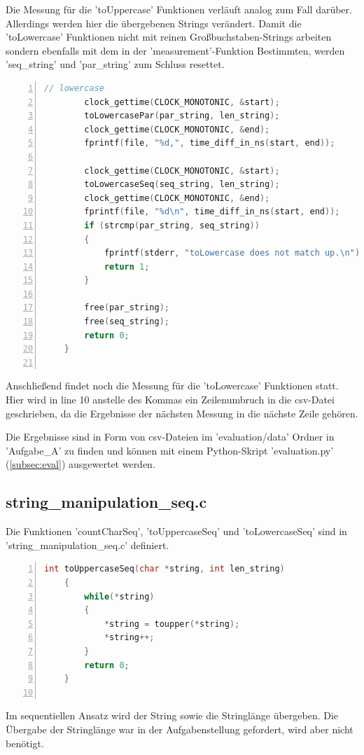 \documentclass[plainarticle,zihtitle,german,final,hyperref,utf8]{zihpub}
\begin{document}
Die Messung für die 'toUppercase' Funktionen verläuft analog zum Fall darüber. Allerdings werden hier die übergebenen Strings verändert. Damit die 'toLowercase' Funktionen nicht mit reinen Großbuchstaben-Strings arbeiten sondern ebenfalls mit dem in der 'measurement'-Funktion Bestimmten, werden 'seq\_string' und 'par\_string' zum Schluss  resettet.

\begin{lstlisting}[language=c, numbers=left]		
		// lowercase
		clock_gettime(CLOCK_MONOTONIC, &start);	
		toLowercasePar(par_string, len_string);
		clock_gettime(CLOCK_MONOTONIC, &end);
		fprintf(file, "%d,", time_diff_in_ns(start, end));	
		
		clock_gettime(CLOCK_MONOTONIC, &start);	
		toLowercaseSeq(seq_string, len_string);
		clock_gettime(CLOCK_MONOTONIC, &end);
		fprintf(file, "%d\n", time_diff_in_ns(start, end));	
		if (strcmp(par_string, seq_string))
		{
			fprintf(stderr, "toLowercase does not match up.\n");
			return 1;
		}
		
		free(par_string);
		free(seq_string);
		return 0;
	}
	
\end{lstlisting}

Anschließend findet noch die Messung für die 'toLowercase' Funktionen statt.
Hier wird in line 10 anstelle des Kommas ein Zeilenumbruch in die csv-Datei geschrieben, da die Ergebnisse der nächsten Messung in die nächste Zeile gehören.

Die Ergebnisse sind in Form von csv-Dateien im 'evaluation/data' Ordner in 'Aufgabe\_A' zu finden und können mit einem Python-Skript 'evaluation.py' (\ref{subsec:eval}) ausgewertet werden.


\subsection{string\_manipulation\_seq.c}
Die Funktionen 'countCharSeq', 'toUppercaseSeq' und 'toLowercaseSeq' sind in 'string\_manipulation\_seq.c' definiert.

\begin{lstlisting}[language=c, numbers=left]
	int toUppercaseSeq(char *string, int len_string)
	{
		while(*string)
		{
			*string = toupper(*string);
			*string++;
		}
		return 0;
	}
	
\end{lstlisting}

Im sequentiellen Ansatz wird der String sowie die Stringlänge übergeben. Die Übergabe der Stringlänge war in der Aufgabenstellung gefordert, wird aber nicht benötigt.
\end{document}

